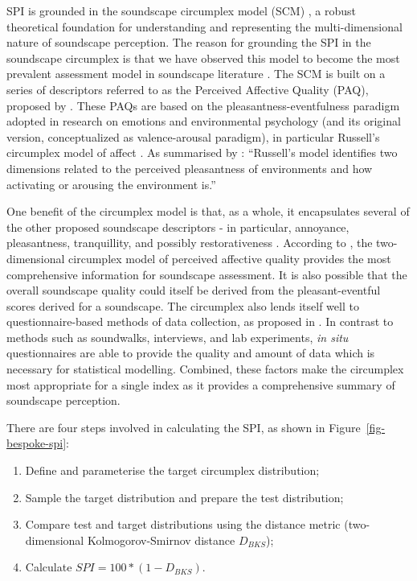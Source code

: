 \documentclass[
  authoryear,
  preprint,
  1p]{elsarticle}
\providecommand{\tightlist}{%
  \setlength{\itemsep}{0pt}\setlength{\parskip}{0pt}}\usepackage{longtable,booktabs,array}
\begin{document}
SPI is grounded in the soundscape circumplex model (SCM)
\citep{Axelsson2010principal, Axelsson2012Swedish}, a robust theoretical
foundation for understanding and representing the multi-dimensional
nature of soundscape perception. The reason for grounding the SPI in the
soundscape circumplex is that we have observed this model to become the
most prevalent assessment model in soundscape literature
\citep{Aletta2023Adoption}. The SCM is built on a series of descriptors
referred to as the Perceived Affective Quality (PAQ), proposed by
\citep{Axelsson2010principal}. These PAQs are based on the
pleasantness-eventfulness paradigm adopted in research on emotions and
environmental psychology (and its original version, conceptualized as
valence-arousal paradigm), in particular Russell's circumplex model of
affect \citep{Russell1980circumplex}. As summarised by
\citet{Axelsson2010principal}: ``Russell's model identifies two
dimensions related to the perceived pleasantness of environments and how
activating or arousing the environment is.''

One benefit of the circumplex model is that, as a whole, it encapsulates
several of the other proposed soundscape descriptors - in particular,
annoyance, pleasantness, tranquillity, and possibly restorativeness
\citep{Aletta2016Soundscape}. According to \citet{Axelsson2015How}, the
two-dimensional circumplex model of perceived affective quality provides
the most comprehensive information for soundscape assessment. It is also
possible that the overall soundscape quality could itself be derived
from the pleasant-eventful scores derived for a soundscape. The
circumplex also lends itself well to questionnaire-based methods of data
collection, as proposed in \citet{ISO12913Part2}. In contrast to methods
such as soundwalks, interviews, and lab experiments, \emph{in situ}
questionnaires are able to provide the quality and amount of data which
is necessary for statistical modelling. Combined, these factors make the
circumplex most appropriate for a single index as it provides a
comprehensive summary of soundscape perception.

There are four steps involved in calculating the SPI, as shown in
Figure~\ref{fig-bespoke-spi}:

\begin{enumerate}
\def\labelenumi{\arabic{enumi}.}
\tightlist
\item
  Define and parameterise the target circumplex distribution;
\item
  Sample the target distribution and prepare the test distribution;
\item
  Compare test and target distributions using the distance metric
  (two-dimensional Kolmogorov-Smirnov distance \(D_{BKS}\));
\item
  Calculate \(SPI = 100 * (1 - D_{BKS})\).
\end{enumerate}
\end{document}
